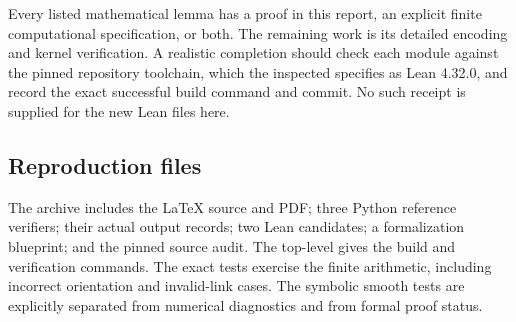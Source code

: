Every listed mathematical lemma has a proof in this report, an explicit finite computational specification, or both. The remaining work is its detailed encoding and kernel verification. A realistic completion should check each module against the pinned repository toolchain, which the inspected  specifies as Lean 4.32.0, and record the exact successful build command and commit. No such receipt is supplied for the new Lean files here.

\subsection{Reproduction files}

The archive includes the LaTeX source and PDF; three Python reference verifiers; their actual output records; two Lean candidates; a formalization blueprint; and the pinned source audit. The top-level  gives the build and verification commands. The exact tests exercise the finite arithmetic, including incorrect orientation and invalid-link cases. The symbolic smooth tests are explicitly separated from numerical diagnostics and from formal proof status.
